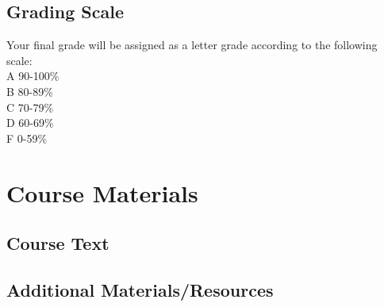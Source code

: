 \documentclass[10pt]{article}
\begin{document}
\subsection*{Grading Scale}
Your final grade will be assigned as a letter grade according to the following scale:\\
A	90-100\%\\
B	80-89\%\\
C	70-79\%\\
D	60-69\%\\
F	0-59\%\\


\section{Course Materials}
\subsection*{Course Text}
%
\subsection*{Additional Materials/Resources}
%
\end{document}
